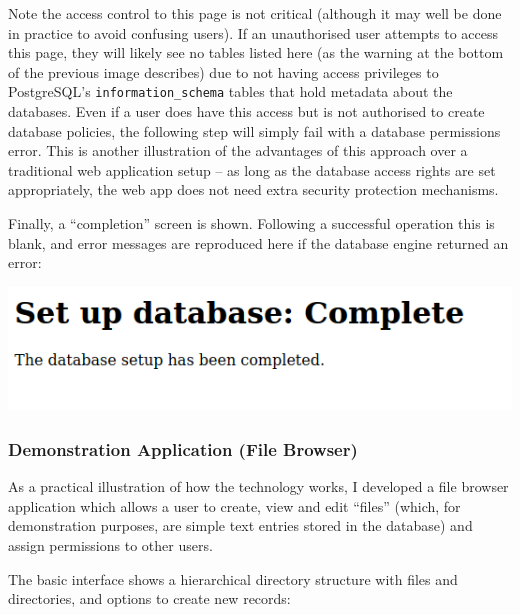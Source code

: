 \documentclass{article}
\begin{document}
Note the access control to this page is not critical (although it may well be done in practice to avoid confusing users). If an unauthorised user attempts to access this page, they will likely see no tables listed here (as the warning at the bottom of the previous image describes) due to not having access privileges to PostgreSQL's \verb+information_schema+ tables that hold metadata about the databases. Even if a user does have this access but is not authorised to create database policies, the following step will simply fail with a database permissions error. This is another illustration of the advantages of this approach over a traditional web application setup -- as long as the database access rights are set appropriately, the web app does not need extra security protection mechanisms.

Finally, a ``completion'' screen is shown. Following a successful operation this is blank, and error messages are reproduced here if the database engine returned an error:

\begin{center}
  \includegraphics[scale=0.5]{04-setup3.png}
\end{center}

\subsubsection{Demonstration Application (File Browser)}
As a practical illustration of how the technology works, I developed a file browser application which allows a user to create, view and edit ``files'' (which, for demonstration purposes, are simple text entries stored in the database) and assign permissions to other users.

The basic interface shows a hierarchical directory structure with files and directories, and options to create new records:
\end{document}
